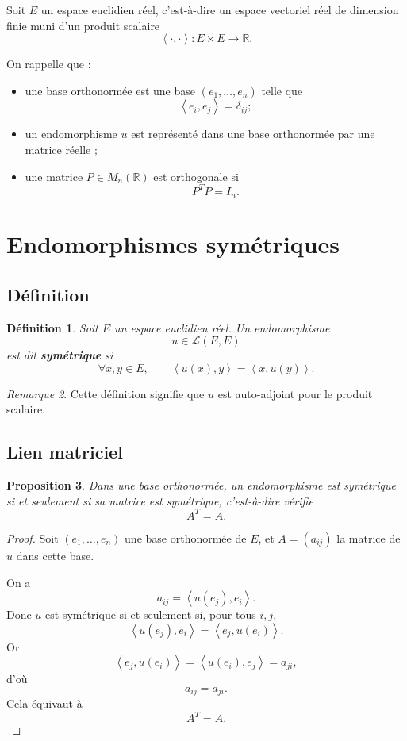 \documentclass[11pt,a4paper]{article}
\newtheorem{definition}{Définition}[section]
\newtheorem{proposition}[definition]{Proposition}
\theoremstyle{remark}
\newtheorem{remarque}[definition]{Remarque}
\newcommand{\R}{\mathbb{R}}
\newcommand{\scal}[2]{\left\langle #1,#2\right\rangle}
\begin{document}
Soit \(E\) un espace euclidien réel, c’est-à-dire un espace vectoriel réel de dimension finie muni d’un produit scalaire
\[
\scal{\cdot}{\cdot}:E\times E\to \R.
\]

On rappelle que :
\begin{itemize}
    \item une base orthonormée est une base \((e_1,\dots,e_n)\) telle que
    \[
    \scal{e_i}{e_j}=\delta_{ij} ;
    \]
    \item un endomorphisme \(u\) est représenté dans une base orthonormée par une matrice réelle ;
    \item une matrice \(P\in M_n(\R)\) est orthogonale si
    \[
    P^TP=I_n.
    \]
\end{itemize}

\section{Endomorphismes symétriques}

\subsection{Définition}

\begin{definition}
Soit \(E\) un espace euclidien réel. Un endomorphisme
\[
u\in\mathcal L(E,E)
\]
est dit \textbf{symétrique} si
\[
\forall x,y\in E,\qquad \scal{u(x)}{y}=\scal{x}{u(y)}.
\]
\end{definition}

\begin{remarque}
Cette définition signifie que \(u\) est auto-adjoint pour le produit scalaire.
\end{remarque}

\subsection{Lien matriciel}

\begin{proposition}
Dans une base orthonormée, un endomorphisme est symétrique si et seulement si sa matrice est symétrique, c’est-à-dire vérifie
\[
A^T=A.
\]
\end{proposition}

\begin{proof}
Soit \((e_1,\dots,e_n)\) une base orthonormée de \(E\), et \(A=(a_{ij})\) la matrice de \(u\) dans cette base.

On a
\[
a_{ij}=\scal{u(e_j)}{e_i}.
\]
Donc \(u\) est symétrique si et seulement si, pour tous \(i,j\),
\[
\scal{u(e_j)}{e_i}=\scal{e_j}{u(e_i)}.
\]
Or
\[
\scal{e_j}{u(e_i)}=\scal{u(e_i)}{e_j}=a_{ji},
\]
d’où
\[
a_{ij}=a_{ji}.
\]
Cela équivaut à
\[
A^T=A.
\]
\end{proof}
\end{document}

